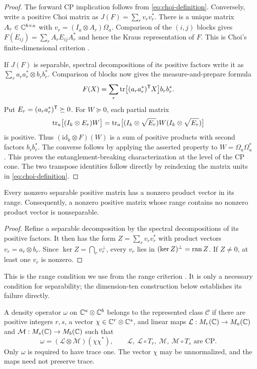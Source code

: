 \begin{proof}
The forward CP implication follows from \eqref{eq:choi-definition}.
Conversely, write a positive Choi matrix as
$J(F)=\sum_r v_rv_r^*$.  There is a unique matrix
$A_r\in\mathbb C^{b\times a}$ with $v_r=(I_a\otimes A_r)\Omega_a$.
Comparison of the $(i,j)$ blocks gives
$F(E_{ij})=\sum_r A_rE_{ij}A_r^*$ and hence the Kraus representation of
$F$.  This is Choi's finite-dimensional criterion \cite{Choi1975}.

If $J(F)$ is separable, spectral decompositions of its positive factors
write it as $\sum_r a_ra_r^*\otimes b_rb_r^*$.  Comparison of blocks now
gives the measure-and-prepare formula
\[
 F(X)=\sum_r \operatorname{tr}\bigl[(a_ra_r^*)^{\mathsf T}X\bigr]b_rb_r^*.
\]
Put $E_r=(a_ra_r^*)^{\mathsf T}\succeq0$.  For $W\succeq0$, each partial matrix
\[
 \operatorname{tr}_a\bigl[(I_k\otimes E_r)W\bigr]
 =\operatorname{tr}_a\bigl[(I_k\otimes\sqrt{E_r})W
                         (I_k\otimes\sqrt{E_r})\bigr]
\]
is positive.  Thus $(\mathrm{id}_k\otimes F)(W)$ is a sum of positive
products with second factors $b_rb_r^*$.  The converse follows by applying
the asserted property to $W=\Omega_a\Omega_a^*$.  This proves the
entanglement-breaking characterization \cite[Theorem 4]{HSR2003} at the
level of the CP cone.  The two transpose identities follow directly by
reindexing the matrix units in \eqref{eq:choi-definition}.
\end{proof}

\begin{lemma}\label{lem:product-range}
Every nonzero separable positive matrix has a nonzero product vector in its
range.  Consequently, a nonzero positive matrix whose range contains no
nonzero product vector is nonseparable.
\end{lemma}

\begin{proof}
Refine a separable decomposition by the spectral decompositions of its
positive factors.  It then has the form $Z=\sum_r v_rv_r^*$ with product
vectors $v_r=a_r\otimes b_r$.  Since
$\ker Z=\bigcap_r v_r^\perp$, every $v_r$ lies in
$(\ker Z)^\perp=\operatorname{ran} Z$.  If $Z\ne0$, at least one $v_r$ is nonzero.
\end{proof}

This is the range condition we use from the range criterion
\cite{Horodecki1997}.  It is only a necessary condition for separability;
the dimension-ten construction below establishes its failure directly.

\begin{definition}\label{def:represented-class}
A density operator $\omega$ on $\mathbb C^a\otimes\mathbb C^b$ belongs to the represented
class $\mathscr C$ if there are positive integers $r,s$, a vector
$\chi\in\mathbb C^r\otimes\mathbb C^s$, and linear maps
$\mathcal L:M_{r}(\mathbb C)\to M_{a}(\mathbb C)$ and $\mathcal M:M_{s}(\mathbb C)\to M_{b}(\mathbb C)$ such that
\begin{equation}\label{eq:represented-class}
 \omega=(\mathcal L\otimes\mathcal M)(\chi\chi^*),
 \qquad
 \mathcal L,\ \mathcal L\circ T_r,\ \mathcal M,\ \mathcal M\circ T_s
 \text{ are CP}.
\end{equation}
Only $\omega$ is required to have trace one.  The vector $\chi$ may be
unnormalized, and the maps need not preserve trace.
\end{definition}


